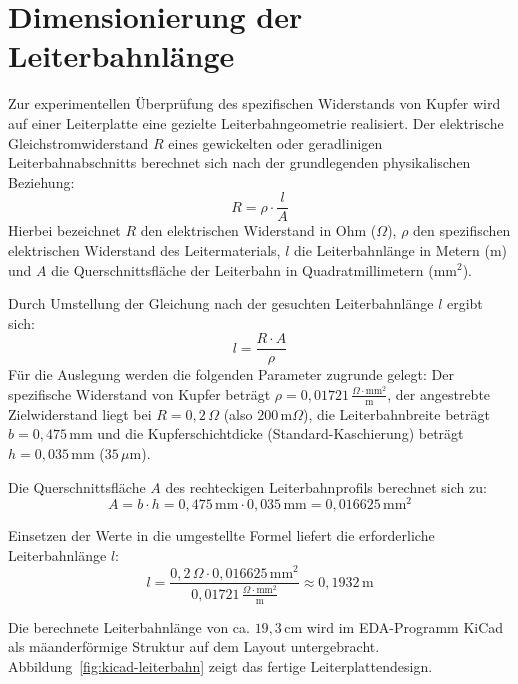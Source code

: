 \section{Dimensionierung der Leiterbahnlänge}
Zur experimentellen Überprüfung des spezifischen Widerstands von Kupfer wird auf einer Leiterplatte eine gezielte Leiterbahngeometrie realisiert. Der elektrische Gleichstromwiderstand $R$ eines gewickelten oder geradlinigen Leiterbahnabschnitts berechnet sich nach der grundlegenden physikalischen Beziehung:
\begin{equation}
    R = \rho \cdot \frac{l}{A}
\end{equation}
Hierbei bezeichnet $R$ den elektrischen Widerstand in Ohm ($\Omega$), $\rho$ den spezifischen elektrischen Widerstand des Leitermaterials, $l$ die Leiterbahnlänge in Metern ($\text{m}$) und $A$ die Querschnittsfläche der Leiterbahn in Quadratmillimetern ($\text{mm}^2$).

Durch Umstellung der Gleichung nach der gesuchten Leiterbahnlänge $l$ ergibt sich:
\begin{equation}
    l = \frac{R \cdot A}{\rho}
\end{equation}
Für die Auslegung werden die folgenden Parameter zugrunde gelegt: Der spezifische Widerstand von Kupfer beträgt $\rho = 0{,}01721 \, \frac{\Omega \cdot \text{mm}^2}{\text{m}}$, der angestrebte Zielwiderstand liegt bei $R = 0{,}2 \, \Omega$ (also $200 \, \mathrm{m}\Omega$), die Leiterbahnbreite beträgt $b = 0{,}475 \, \text{mm}$ und die Kupferschichtdicke (Standard-Kaschierung) beträgt $h = 0{,}035 \, \text{mm}$ ($35 \, \mu\text{m}$).

Die Querschnittsfläche $A$ des rechteckigen Leiterbahnprofils berechnet sich zu:
\begin{equation}
    A = b \cdot h = 0{,}475 \, \text{mm} \cdot 0{,}035 \, \text{mm} = 0{,}016625 \, \text{mm}^2
\end{equation}

Einsetzen der Werte in die umgestellte Formel liefert die erforderliche Leiterbahnlänge $l$:
\begin{equation}
    l = \frac{0{,}2 \, \Omega \cdot 0{,}016625 \, \text{mm}^2}{0{,}01721 \, \frac{\Omega \cdot \text{mm}^2}{\text{m}}} \approx 0{,}1932 \, \text{m}
\end{equation}

Die berechnete Leiterbahnlänge von ca. $19{,}3 \, \text{cm}$ wird im EDA-Programm KiCad als mäanderförmige Struktur auf dem Layout untergebracht. Abbildung~\ref{fig:kicad-leiterbahn} zeigt das fertige Leiterplattendesign.

